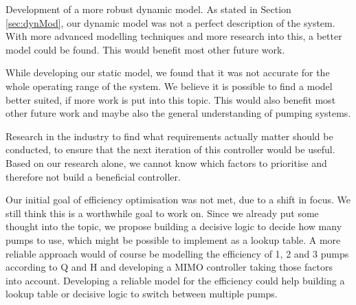 Development of a more robust dynamic model.
As stated in Section \ref{sec:dynMod},
our dynamic model was not a perfect description of the system.
With more advanced modelling techniques and more research into this,
a better model could be found.
This would benefit most other future work.

While developing our static model,
we found that it was not accurate for the whole operating range of the system.
We believe it is possible to find a model better suited,
if more work is put into this topic.
This would also benefit most other future work
and maybe also the general understanding of pumping systems.

Research in the industry to find what requirements actually matter should be conducted,
to ensure that the next iteration of this controller would be useful.
Based on our research alone,
we cannot know which factors to prioritise
and therefore not build a beneficial controller.

Our initial goal of efficiency optimisation was not met,
due to a shift in focus.
We still think this is a worthwhile goal to work on.
Since we already put some thought into the topic,
we propose building a decisive logic to decide how many pumps to use,
which might be possible to implement as a lookup table.
A more reliable approach would of course be modelling the efficiency of 1, 2 and 3 pumps according to Q and H
and developing a MIMO controller taking those factors into account.
Developing a reliable model for the efficiency could help building a lookup table or decisive logic to switch between multiple pumps.

